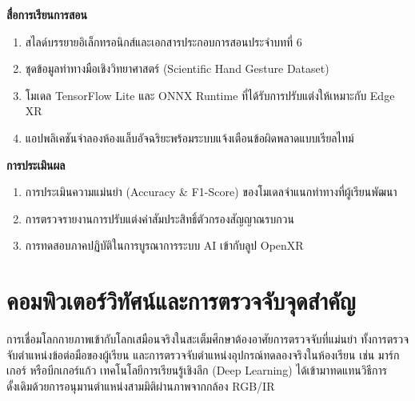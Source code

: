 \noindent\textbf{สื่อการเรียนการสอน}
\begin{enumerate}
    \item สไลด์บรรยายอิเล็กทรอนิกส์และเอกสารประกอบการสอนประจำบทที่ 6
    \item ชุดข้อมูลท่าทางมือเชิงวิทยาศาสตร์ (Scientific Hand Gesture Dataset)
    \item โมเดล TensorFlow Lite และ ONNX Runtime ที่ได้รับการปรับแต่งให้เหมาะกับ Edge XR
    \item แอปพลิเคชันจำลองห้องแล็บอัจฉริยะพร้อมระบบแจ้งเตือนข้อผิดพลาดแบบเรียลไทม์
\end{enumerate}

\noindent\textbf{การประเมินผล}
\begin{enumerate}
    \item การประเมินความแม่นยำ (Accuracy \& F1-Score) ของโมเดลจำแนกท่าทางที่ผู้เรียนพัฒนา
    \item การตรวจรายงานการปรับแต่งค่าสัมประสิทธิ์ตัวกรองสัญญาณรบกวน
    \item การทดสอบภาคปฏิบัติในการบูรณาการระบบ AI เข้ากับลูป OpenXR
\end{enumerate}

\newpage

\section{คอมพิวเตอร์วิทัศน์และการตรวจจับจุดสำคัญ}

การเชื่อมโลกกายภาพเข้ากับโลกเสมือนจริงในสะเต็มศึกษาต้องอาศัยการตรวจจับที่แม่นยำ ทั้งการตรวจจับตำแหน่งข้อต่อมือของผู้เรียน และการตรวจจับตำแหน่งอุปกรณ์ทดลองจริงในห้องเรียน เช่น มาร์กเกอร์ หรือบีกเกอร์แก้ว เทคโนโลยีการเรียนรู้เชิงลึก (Deep Learning) ได้เข้ามาทดแทนวิธีการดั้งเดิมด้วยการอนุมานตำแหน่งสามมิติผ่านภาพจากกล้อง RGB/IR

